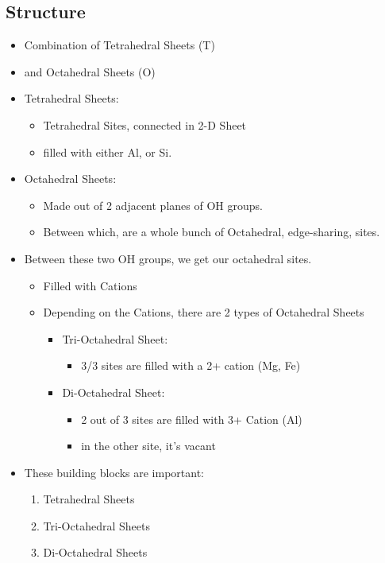 \documentclass[11pt]{article}
\begin{document}
\subsection{Structure}
\label{sec-3-1}
\begin{itemize}
\item Combination of Tetrahedral Sheets (T)
\item and Octahedral Sheets (O)
\item Tetrahedral Sheets:
\begin{itemize}
\item Tetrahedral Sites, connected in 2-D Sheet
\item filled with either Al, or Si.
\end{itemize}
\item Octahedral Sheets:
\begin{itemize}
\item Made out of 2 adjacent planes of OH groups.
\item Between which, are a whole bunch of Octahedral, edge-sharing, sites.
\end{itemize}
\item Between these two OH groups, we get our octahedral sites.
\begin{itemize}
\item Filled with Cations
\item Depending on the Cations, there are 2 types of Octahedral Sheets
\begin{itemize}
\item Tri-Octahedral Sheet:
\begin{itemize}
\item 3/3 sites are filled with a 2+ cation (Mg, Fe)
\end{itemize}
\item Di-Octahedral Sheet:
\begin{itemize}
\item 2 out of 3 sites are filled with 3+ Cation (Al)
\item in the other site, it's vacant
\end{itemize}
\end{itemize}
\end{itemize}
\item These building blocks are important:
\begin{enumerate}
\item Tetrahedral Sheets
\item Tri-Octahedral Sheets
\item Di-Octahedral Sheets
\end{enumerate}

\end{itemize}
\end{document}

